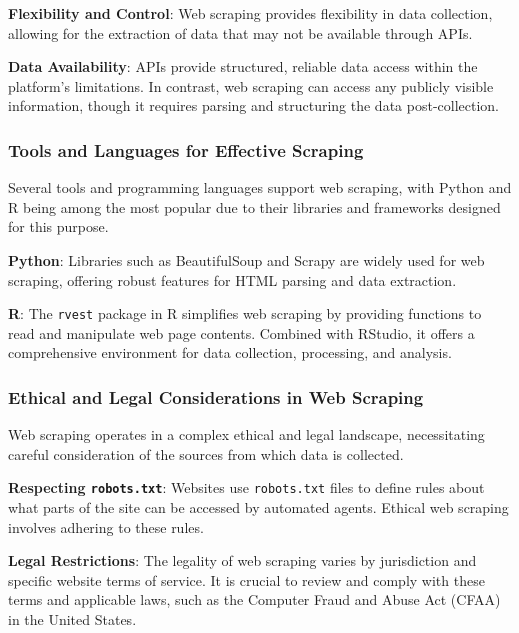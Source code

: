 \documentclass[
]{book}
\begin{document}
\textbf{Flexibility and Control}: Web scraping provides flexibility in data collection, allowing for the extraction of data that may not be available through APIs.

\textbf{Data Availability}: APIs provide structured, reliable data access within the platform's limitations. In contrast, web scraping can access any publicly visible information, though it requires parsing and structuring the data post-collection.

\hypertarget{tools-and-languages-for-effective-scraping}{%
\subsubsection*{Tools and Languages for Effective Scraping}\label{tools-and-languages-for-effective-scraping}}

Several tools and programming languages support web scraping, with Python and R being among the most popular due to their libraries and frameworks designed for this purpose.

\textbf{Python}: Libraries such as BeautifulSoup and Scrapy are widely used for web scraping, offering robust features for HTML parsing and data extraction.

\textbf{R}: The \texttt{rvest} package in R simplifies web scraping by providing functions to read and manipulate web page contents. Combined with RStudio, it offers a comprehensive environment for data collection, processing, and analysis.

\hypertarget{ethical-and-legal-considerations-in-web-scraping}{%
\subsubsection*{Ethical and Legal Considerations in Web Scraping}\label{ethical-and-legal-considerations-in-web-scraping}}

Web scraping operates in a complex ethical and legal landscape, necessitating careful consideration of the sources from which data is collected.

\textbf{Respecting \texttt{robots.txt}}: Websites use \texttt{robots.txt} files to define rules about what parts of the site can be accessed by automated agents. Ethical web scraping involves adhering to these rules.

\textbf{Legal Restrictions}: The legality of web scraping varies by jurisdiction and specific website terms of service. It is crucial to review and comply with these terms and applicable laws, such as the Computer Fraud and Abuse Act (CFAA) in the United States.
\end{document}
